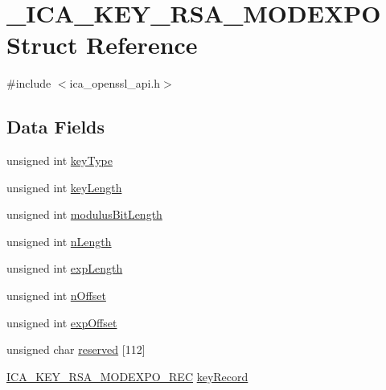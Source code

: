 \hypertarget{struct___i_c_a___k_e_y___r_s_a___m_o_d_e_x_p_o}{}\section{\+\_\+\+I\+C\+A\+\_\+\+K\+E\+Y\+\_\+\+R\+S\+A\+\_\+\+M\+O\+D\+E\+X\+PO Struct Reference}
\label{struct___i_c_a___k_e_y___r_s_a___m_o_d_e_x_p_o}


{\ttfamily \#include $<$ica\+\_\+openssl\+\_\+api.\+h$>$}

\subsection*{Data Fields}
\begin{DoxyCompactItemize}
\item 
unsigned int \hyperlink{struct___i_c_a___k_e_y___r_s_a___m_o_d_e_x_p_o_a95d86e5c4ec0986957452a5988dfed1b}{key\+Type}
\item 
unsigned int \hyperlink{struct___i_c_a___k_e_y___r_s_a___m_o_d_e_x_p_o_ad5ba5324abb07fb76cd8f114a333a3d0}{key\+Length}
\item 
unsigned int \hyperlink{struct___i_c_a___k_e_y___r_s_a___m_o_d_e_x_p_o_af71a551186e94efadaed42c8b53a73f6}{modulus\+Bit\+Length}
\item 
unsigned int \hyperlink{struct___i_c_a___k_e_y___r_s_a___m_o_d_e_x_p_o_a220805d4ce9b8ea604c6d2f91b08c03e}{n\+Length}
\item 
unsigned int \hyperlink{struct___i_c_a___k_e_y___r_s_a___m_o_d_e_x_p_o_a8601dc175d7f18e803898bc36d99a095}{exp\+Length}
\item 
unsigned int \hyperlink{struct___i_c_a___k_e_y___r_s_a___m_o_d_e_x_p_o_a1de4175a8d18dd85ba87d6d40b2dc31e}{n\+Offset}
\item 
unsigned int \hyperlink{struct___i_c_a___k_e_y___r_s_a___m_o_d_e_x_p_o_a3da8fab9517fa7af751da8b90b3a7477}{exp\+Offset}
\item 
unsigned char \hyperlink{struct___i_c_a___k_e_y___r_s_a___m_o_d_e_x_p_o_a464fbb0d2555102ec6b8cbd448731748}{reserved} \mbox{[}112\mbox{]}
\item 
\hyperlink{ica__openssl__api_8h_a252aafae5cc9a87558165fdbfc64b90c}{I\+C\+A\+\_\+\+K\+E\+Y\+\_\+\+R\+S\+A\+\_\+\+M\+O\+D\+E\+X\+P\+O\+\_\+\+R\+EC} \hyperlink{struct___i_c_a___k_e_y___r_s_a___m_o_d_e_x_p_o_abdb68bb25b18429d02982105537a8087}{key\+Record}
\end{DoxyCompactItemize}


